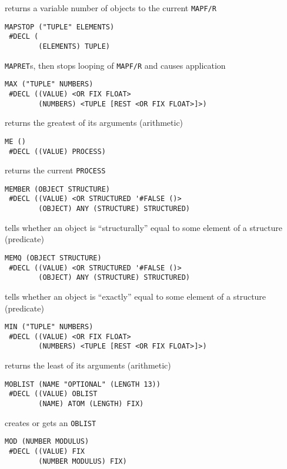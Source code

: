 \documentclass[a4paper]{scrbook}
\begin{document}
returns a variable number of objects to the current \texttt{MAPF/R}

\begin{verbatim}
MAPSTOP ("TUPLE" ELEMENTS)
 #DECL (
        (ELEMENTS) TUPLE)
\end{verbatim}

\texttt{MAPRET}s, then stops looping of \texttt{MAPF/R} and causes application

\begin{verbatim}
MAX ("TUPLE" NUMBERS)
 #DECL ((VALUE) <OR FIX FLOAT>
        (NUMBERS) <TUPLE [REST <OR FIX FLOAT>]>)
\end{verbatim}

returns the greatest of its arguments (arithmetic)

\begin{verbatim}
ME ()
 #DECL ((VALUE) PROCESS)
\end{verbatim}

returns the current \texttt{PROCESS}

\begin{verbatim}
MEMBER (OBJECT STRUCTURE)
 #DECL ((VALUE) <OR STRUCTURED '#FALSE ()>
        (OBJECT) ANY (STRUCTURE) STRUCTURED)
\end{verbatim}

tells whether an object is ``structurally'' equal to some element of a structure (predicate)

\begin{verbatim}
MEMQ (OBJECT STRUCTURE)
 #DECL ((VALUE) <OR STRUCTURED '#FALSE ()>
        (OBJECT) ANY (STRUCTURE) STRUCTURED)
\end{verbatim}

tells whether an object is ``exactly'' equal to some element of a structure (predicate)

\begin{verbatim}
MIN ("TUPLE" NUMBERS)
 #DECL ((VALUE) <OR FIX FLOAT>
        (NUMBERS) <TUPLE [REST <OR FIX FLOAT>]>)
\end{verbatim}

returns the least of its arguments (arithmetic)

\begin{verbatim}
MOBLIST (NAME "OPTIONAL" (LENGTH 13))
 #DECL ((VALUE) OBLIST
        (NAME) ATOM (LENGTH) FIX)
\end{verbatim}

creates or gets an \texttt{OBLIST}

\begin{verbatim}
MOD (NUMBER MODULUS)
 #DECL ((VALUE) FIX
        (NUMBER MODULUS) FIX)
\end{verbatim}
\end{document}
